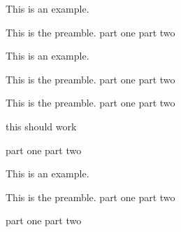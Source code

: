 \ex This is an example.\xe

\pex
This is the preamble.
\a part one
\a part two
\xe

\hfil

\ex This is an example.\xe

\pex
This is the preamble.
\a part one
\a part two
\xe





\pex
This is the preamble.
\a part one
\a part two
\xe

\resetexcnt
\pex
this should work
\xe

\pex
\a part one
\a part two
\xe



\endgroup

\ex This is an example.\xe

\pex
This is the preamble.
\a part one
\a part two
\xe

\pex
\a part one
\a part two
\xe






